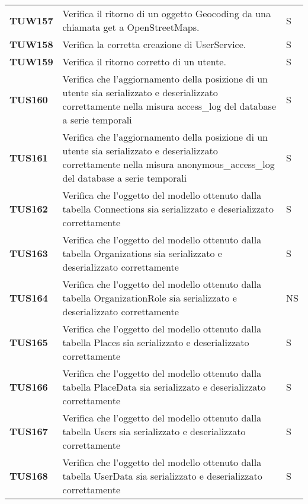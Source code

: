 \documentclass[../../piano-di-qualifica.tex]{subfiles}
\begin{document}
\begin{longtable}[H]{>{\centering\bfseries}m{3cm} >{}m{10cm} >{\centering\arraybackslash}m{3cm}}
  TUW157             & Verifica il ritorno di un oggetto Geocoding da una chiamata get a OpenStreetMaps.                                   & S                             \\


  TUW158             & Verifica la corretta creazione di UserService.                                                                      & S                             \\

  TUW159             & Verifica il ritorno corretto di un utente.                                                                          & S                             \\


  TUS160 & Verifica che l'aggiornamento della posizione di un utente sia serializzato e deserializzato correttamente nella misura access\_log del database a serie temporali & S \\
  TUS161 & Verifica che l'aggiornamento della posizione di un utente sia serializzato e deserializzato correttamente nella misura anonymous\_access\_log del database a serie temporali & S \\


  TUS162 & Verifica che l'oggetto del modello ottenuto dalla tabella Connections sia serializzato e deserializzato correttamente & S \\
  TUS163 & Verifica che l'oggetto del modello ottenuto dalla tabella Organizations sia serializzato e deserializzato correttamente & S \\
  TUS164 & Verifica che l'oggetto del modello ottenuto dalla tabella OrganizationRole sia serializzato e deserializzato correttamente & NS \\
  TUS165 & Verifica che l'oggetto del modello ottenuto dalla tabella Places sia serializzato e deserializzato correttamente & S \\
  TUS166 & Verifica che l'oggetto del modello ottenuto dalla tabella PlaceData sia serializzato e deserializzato correttamente & S \\
  TUS167 & Verifica che l'oggetto del modello ottenuto dalla tabella Users sia serializzato e deserializzato correttamente & S \\
  TUS168 & Verifica che l'oggetto del modello ottenuto dalla tabella UserData sia serializzato e deserializzato correttamente & S \\


\end{longtable}
\end{document}
